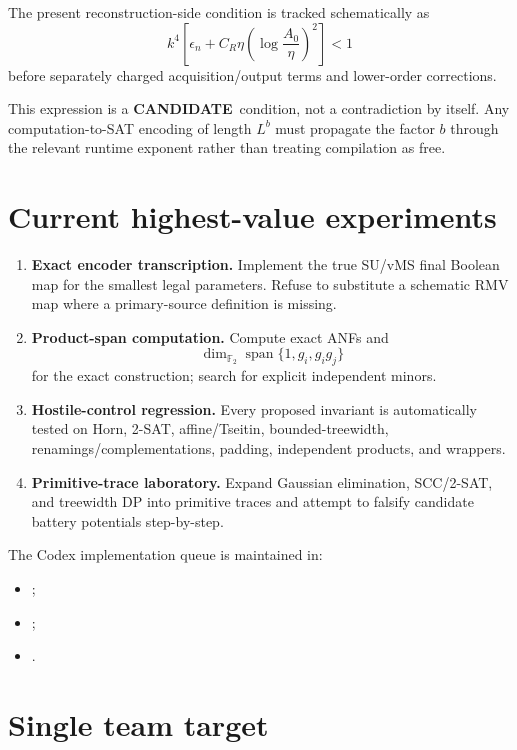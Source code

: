 \documentclass[11pt]{article}
\newcommand{\statuscandidate}{\textcolor{candidate}{\textbf{CANDIDATE}}}
\newcommand{\Ftwo}{\mathbb{F}_2}
\begin{document}
The present reconstruction-side condition is tracked schematically as
\[
\boxed{
k^4
\left[
  \epsilon_n
  +
  C_R\eta\!\left(\log\frac{A_0}{\eta}\right)^2
\right]
<1
}
\]
before separately charged acquisition/output terms and lower-order corrections.

This expression is a \statuscandidate\ condition, not a contradiction by itself. Any
computation-to-SAT encoding of length \(L^b\) must propagate the factor \(b\) through the relevant
runtime exponent rather than treating compilation as free.

\section{Current highest-value experiments}

\begin{enumerate}
  \item \textbf{Exact encoder transcription.}
        Implement the true SU/vMS final Boolean map for the smallest legal parameters. Refuse to
        substitute a schematic RMV map where a primary-source definition is missing.
  \item \textbf{Product-span computation.}
        Compute exact ANFs and
        \[
          \dim_{\Ftwo}\operatorname{span}\{1,g_i,g_i g_j\}
        \]
        for the exact construction; search for explicit independent minors.
  \item \textbf{Hostile-control regression.}
        Every proposed invariant is automatically tested on Horn, 2-SAT, affine/Tseitin,
        bounded-treewidth, renamings/complementations, padding, independent products, and wrappers.
  \item \textbf{Primitive-trace laboratory.}
        Expand Gaussian elimination, SCC/2-SAT, and treewidth DP into primitive traces and attempt to
        falsify candidate battery potentials step-by-step.
\end{enumerate}

The Codex implementation queue is maintained in:
\begin{itemize}
  \item {};
  \item {};
  \item {}.
\end{itemize}

\section{Single team target}
\end{document}
